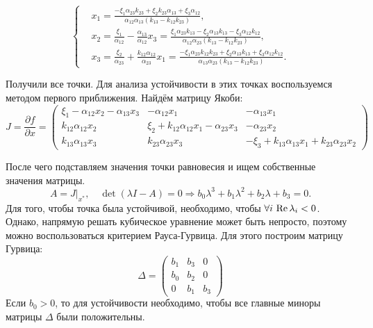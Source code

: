 \begin{enumerate}
            \[
                \left\{\begin{split}
                    & x_1 = \frac{-\xi_1 \alpha_{23} k_{23} + \xi_2 k_{23} \alpha_{13} + \xi_3 \alpha_{12}}{\alpha_{12} \alpha_{13} (k_{13} - k_{12} k_{23})}, \\
                    & x_2 = \frac{\xi_1}{\alpha_{12}} - \frac{\alpha_{13}}{\alpha_{12}} x_3
                    = \frac{\xi_1 \alpha_{23} k_{13} - \xi_2 \alpha_{13} k_{13} - \xi_3 \alpha_{12} k_{12}}{\alpha_{12} \alpha_{23} (k_{13} - k_{12} k_{23})}, \\ 
                    & x_3 = \frac{\xi_2}{\alpha_{23}} + \frac{k_{12} \alpha_{12}}{\alpha_{23}} x_1
                    = \frac{-\xi_1 \alpha_{23} k_{12} k_{23} + \xi_2 \alpha_{13} k_{13} + \xi_3 \alpha_{12} k_{12}}{\alpha_{13} \alpha_{23} (k_{13} - k_{12} k_{23})}.
                \end{split}\right.
            \]
    \end{enumerate}

    Получили все точки. Для анализа устойчивости в этих точках воспользуемся методом первого приближения. Найдём матрицу Якоби:
    \[
        J = \frac{\partial f}{\partial x} = \left(\begin{matrix}
            \xi_1 - \alpha_{12} x_2 - \alpha_{13} x_3 & -\alpha_{12} x_1 & -\alpha_{13} x_1 \\
            k_{12} \alpha_{12} x_2 & \xi_2 + k_{12} \alpha_{12} x_1 - \alpha_{23} x_3 & -\alpha_{23} x_2 \\
            k_{13} \alpha_{13} x_3 & k_{23} \alpha_{23} x_3  & -\xi_3 + k_{13} \alpha_{13} x_1 + k_{23} \alpha_{23} x_2
        \end{matrix}\right)
    \]

    После чего подставляем значения точки равновесия и ищем собственные значения матрицы. 
    \[
        A = J \big|_{x^*}, \quad \det \left( \lambda I - A \right) = 0 \Rightarrow b_0 \lambda^3 + b_1 \lambda^2 + b_2 \lambda + b_3 = 0.
    \]
    Для того, чтобы точка была устойчивой, необходимо, чтобы \( \forall i \, \operatorname{Re} \lambda_i < 0 \). Однако, напрямую решать кубическое уравнение может быть непросто, поэтому можно воспользоваться критерием Рауса-Гурвица. Для этого построим матрицу Гурвица: 
    \[
        \Delta = \left( \begin{matrix}
            b_1 & b_3 & 0 \\
            b_0 & b_2 & 0 \\
            0   & b_1 & b_3
        \end{matrix} \right)
    \]
    Если \( b_0 > 0\), то для устойчивости необходимо, чтобы все главные миноры матрицы \( \Delta \) были положительны.


